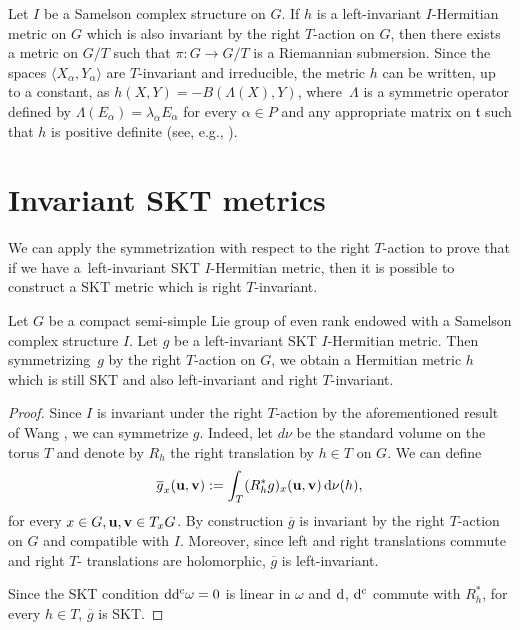 \begin{Remark} \label{remarkAkekseevski} Let $I$ be a Samelson complex structure on $G$. If $h$ is a left-invariant $I$-Hermitian metric on $G$ which is also invariant by the right $T$-action on $G$, then there exists a metric on $G/T$ such that $\pi\colon G\rightarrow G/T$ is a Riemannian submersion. Since the spaces $\langle X_{\alpha}, Y_{\alpha}\rangle$ are $T$-invariant and irreducible,
the metric $h$ can be written, up to a constant, as $h(X,Y)= -B (\Lambda(X),Y)$, where~$\Lambda$ is
a symmetric operator defined by $\Lambda(E_{\alpha})=\lambda_{\alpha} E_{\alpha}$ for every $\alpha \in P$ and any
appropriate matrix on $ \mathfrak t$ such that $h$ is positive definite (see, e.g., \cite{Arv}).
\end{Remark}

\section{Invariant SKT metrics}

 We can apply the symmetrization with respect to the right $T$-action to prove that if we have a~left-invariant SKT $I$-Hermitian metric,
then it is possible to construct a SKT metric which is right $T$-invariant.

\begin{Lemma}\label{llemma1}
Let $G$ be a compact semi-simple Lie group of even rank endowed with a Samelson complex structure $I$. Let $g$ be a left-invariant SKT $I$-Hermitian metric.
Then symmetrizing~$g$ by the right $T$-action on $G$, we obtain a Hermitian metric $h$ which is still SKT and also left-invariant and right $T$-invariant.
\end{Lemma}


\begin{proof} Since $I$ is invariant under the right $T$-action by the aforementioned result of Wang \cite{Wang}, we can symmetrize $g$. Indeed, let $d \nu$ be the standard volume on the torus $T$ and denote by $R_h$ the right translation by $h \in T$ on $G$. We can define
\[
 \overline{g}_x ({\bf u}, {\bf v}) := \int_T (R_h^* g)_x ({\bf u}, {\bf v}) \, {\rm d} \nu (h),
\]
for every $x \in G, {\bf u}, {\bf v} \in T_x G$. By construction $\overline{g}$ is invariant by the right $T$-action on $G$ and compatible with $I$. Moreover, since left and right translations commute and right $T$- translations are holomorphic, $\overline{g}$ is left-invariant.

Since the SKT condition ${\rm d}{\rm d}^{\rm c} \omega= 0$ is linear in $\omega$ and ${\rm d}$, ${\rm d}^{\rm c}$ commute with $R_h^*$, for every $ h \in T$, $\overline{g}$ is SKT. \end{proof}

